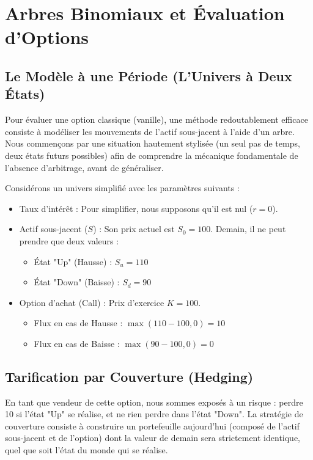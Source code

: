 

\section{Arbres Binomiaux et Évaluation d'Options}

\subsection{Le Modèle à une Période (L'Univers à Deux États)}

Pour évaluer une option classique (vanille), une méthode redoutablement efficace consiste à modéliser les mouvements de l'actif sous-jacent à l'aide d'un arbre. Nous commençons par une situation hautement stylisée (un seul pas de temps, deux états futurs possibles) afin de comprendre la mécanique fondamentale de l'absence d'arbitrage, avant de généraliser.

Considérons un univers simplifié avec les paramètres suivants :
\begin{itemize}[label=$\rightarrow$]
    \item Taux d'intérêt : Pour simplifier, nous supposons qu'il est nul ($r = 0$).
    \item Actif sous-jacent ($S$) : Son prix actuel est $S_0 = 100$. Demain, il ne peut prendre que deux valeurs :
    \begin{itemize}[label=$\cdot$]
        \item État "Up" (Hausse) : $S_u = 110$
        \item État "Down" (Baisse) : $S_d = 90$
    \end{itemize}
    \item Option d'achat (Call) : Prix d'exercice $K = 100$.
    \begin{itemize}[label=$\cdot$]
        \item Flux en cas de Hausse : $\max(110 - 100, 0) = 10$
        \item Flux en cas de Baisse : $\max(90 - 100, 0) = 0$
    \end{itemize}
\end{itemize}

\subsection{Tarification par Couverture (Hedging)}

En tant que vendeur de cette option, nous sommes exposés à un risque : perdre 10 si l'état "Up" se réalise, et ne rien perdre dans l'état "Down". La stratégie de couverture consiste à construire un portefeuille aujourd'hui (composé de l'actif sous-jacent et de l'option) dont la valeur de demain sera strictement identique, quel que soit l'état du monde qui se réalise.


